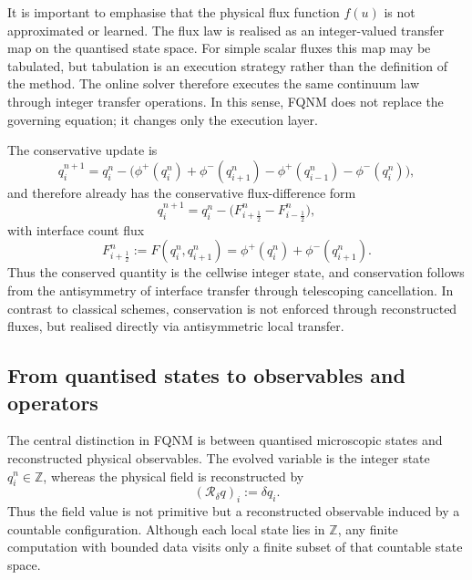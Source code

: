 \documentclass[sn-basic]{sn-jnl}
\theoremstyle{plain}
\theoremstyle{remark}
\begin{document}
It is important to emphasise that the physical flux function $f(u)$ is not approximated or learned. The flux law is realised as an integer-valued transfer map on the quantised state space. For simple scalar fluxes this map may be tabulated, but tabulation is an execution strategy rather than the definition of the method. The online solver therefore executes the same continuum law through integer transfer operations. In this sense, FQNM does not replace the governing equation; it changes only the execution layer.

The conservative update is
\begin{equation}
q_i^{n+1}
= q_i^n
- \Big(
  \phi^+(q_i^n) + \phi^-(q_{i+1}^n)
  - \phi^+(q_{i-1}^n) - \phi^-(q_i^n)
  \Big),
\label{eq:update_rule}
\end{equation}
and therefore already has the conservative flux-difference form
\begin{equation}
q_i^{n+1}=q_i^n-\bigl(F_{i+\frac12}^n-F_{i-\frac12}^n\bigr),
\label{eq:update_rule_conservative_form}
\end{equation}
with interface count flux
\begin{equation}
F_{i+\frac12}^n:=F(q_i^n,q_{i+1}^n)=\phi^+(q_i^n)+\phi^-(q_{i+1}^n).
\label{eq:numerical_count_flux_definition}
\end{equation}
Thus the conserved quantity is the cellwise integer state, and conservation follows from the antisymmetry of interface transfer through telescoping cancellation.
In contrast to classical schemes, conservation is not enforced through reconstructed fluxes, but realised directly via antisymmetric local transfer.

\subsection{From quantised states to observables and operators}
\label{subsec:observables_operators}

The central distinction in FQNM is between quantised microscopic states and reconstructed physical observables. The evolved variable is the integer state $q_i^n\in\mathbb{Z}$, whereas the physical field is reconstructed by
\begin{equation}
(\mathcal R_\delta q)_i := \delta q_i.
\label{eq:reconstruction_operator}
\end{equation}
Thus the field value is not primitive but a reconstructed observable induced by a countable configuration. Although each local state lies in $\mathbb Z$, any finite computation with bounded data visits only a finite subset of that countable state space.
\end{document}
